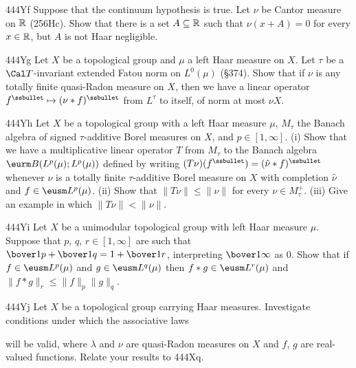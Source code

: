{\spheader 444Yf Suppose that the continuum hypothesis is true.   Let $\nu$
be Cantor measure on $\Bbb R$ (256Hc).   Show that there is a set
$A\subseteq\Bbb R$ such that $\nu(x+A)=0$ for every $x\in\Bbb R$, but
$A$ is not Haar negligible.

\spheader 444Yg Let $X$ be a topological group and $\mu$ a left Haar
measure on $X$.   Let $\tau$ be a $\Cal T$-invariant extended Fatou norm
on $L^0(\mu)$ (\S374).   Show that if $\nu$ is any totally finite
quasi-Radon measure on $X$, then we have a linear operator
$f^{\ssbullet}\mapsto(\nu*f)^{\ssbullet}$ from $L^{\tau}$ to itself, of
norm at most $\nu X$.

\spheader 444Yh Let $X$ be a topological group with a left Haar measure
$\mu$, $M_{\tau}$ the Banach algebra of signed $\tau$-additive Borel
measures on $X$, and $p\in[1,\infty]$.   (i) Show that we have a
multiplicative linear operator $T$ from $M_{\tau}$ to the Banach algebra
$\eurm B(L^p(\mu);L^p(\mu))$ defined by writing
$(T\nu)(f^{\ssbullet})=(\hat\nu*f)^{\ssbullet}$ whenever $\nu$ is a
totally finite $\tau$-additive Borel measure on $X$ with completion
$\hat\nu$ and $f\in\eusm L^p(\mu)$.      (ii) Show that $\|T\nu\|\le\|\nu\|$ for
every $\nu\in M_{\tau}^+$.
(iii) Give an example in which $\|T\nu\|<\|\nu\|$.

\spheader 444Yi Let $X$ be a unimodular topological group with left Haar
measure $\mu$.   Suppose that $p$, $q$, $r\in[1,\infty]$ are such that
$\bover1p+\bover1q=1+\bover1r$, interpreting $\bover1{\infty}$ as $0$.
Show that if $f\in\eusm L^p(\mu)$ and $g\in\eusm L^q(\mu)$ then
$f*g\in\eusm L^r(\mu)$ and $\|f*g\|_r\le\|f\|_p\|g\|_q$.   

\spheader 444Yj Let $X$ be a topological group carrying Haar measures.
Investigate conditions under which the associative laws



\noindent will be valid, where $\lambda$ and $\nu$ are quasi-Radon
measures on $X$ and $f$, $g$ are real-valued functions.   Relate your
results to 444Xq.

}
